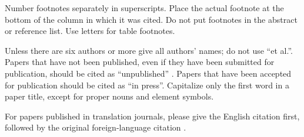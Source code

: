 \documentclass[conference]{IEEEtran}
\begin{document}
Number footnotes separately in superscripts. Place the actual footnote at 
the bottom of the column in which it was cited. Do not put footnotes in the 
abstract or reference list. Use letters for table footnotes.

Unless there are six authors or more give all authors' names; do not use 
``et al.''. Papers that have not been published, even if they have been 
submitted for publication, should be cited as ``unpublished'' . Papers 
that have been accepted for publication should be cited as ``in press''. 
Capitalize only the first word in a paper title, except for proper nouns and 
element symbols.

For papers published in translation journals, please give the English 
citation first, followed by the original foreign-language citation \cite{megalingam_fpga_2016}.


 
\end{document}
